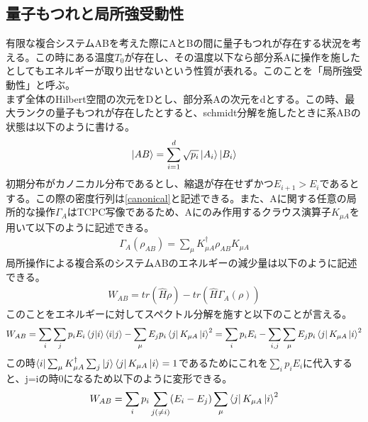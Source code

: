 \documentclass[a4paper,10.5pt]{article}
\numberwithin{equation}{section}
\begin{document}
\subsection{量子もつれと局所強受動性}
 有限な複合システムABを考えた際にAとBの間に量子もつれが存在する状況を考える。この時にある温度$T_{0}$が存在し、その温度以下なら部分系Aに操作を施したとしてもエネルギーが取り出せないという性質が表れる。このことを「局所強受動性」と呼ぶ。\\
 まず全体のHilbert空間の次元をDとし、部分系Aの次元をdとする。この時、最大ランクの量子もつれが存在したとすると、schmidt分解を施したときに系ABの状態は以下のように書ける。
 \begin{equation}\begin{split}
     \ket{AB}=\sum_{i=1}^{d}\sqrt{p_{i}}\ket{A_{i}}\ket{B_{i}} \label{schmidt}
 \end{split} \end{equation}
 初期分布がカノニカル分布であるとし、縮退が存在せずかつ$E_{i+1}>E_{i}$であるとする。この際の密度行列は\eqref{canonical}と記述できる。また、Aに関する任意の局所的な操作$\Gamma_{A}$はTCPC写像であるため、Aにのみ作用するクラウス演算子$K_{\mu A}$を用いて以下のように記述できる。
 \begin{equation}\begin{split}
     \Gamma_{A}(\rho_{AB})=\sum_{\mu}K_{\mu A}^{\dagger}\rho_{AB} K_{\mu A}
 \end{split} \end{equation}
 局所操作による複合系のシステムABのエネルギーの減少量は以下のように記述できる。
 \begin{equation}\begin{split}
     W_{AB} = tr(\hat{H}\rho) -tr(\hat{H}\Gamma_{A}(\rho))
 \end{split} \end{equation}
このことをエネルギーに対してスペクトル分解を施すと以下のことが言える。
\begin{equation}\begin{split}
    W_{AB}=\sum_{i}\sum_{j} p_{i}E_{i}\bra{j}\ket{i}\bra{i}\ket{j}
    -\sum_{\mu}E_{j}p_{i}\bra{j}K_{\mu A}\ket{i}^{2}
    =\sum_{i} p_{i} E_{i} -\sum_{i,j} \sum_{\mu} E_{j}p_{i}\bra{j}K_{\mu A}\ket{i}^{2}
\end{split} \end{equation}
この時$\bra{i}\sum_{\mu} K^{\dagger}_{\mu A}\sum_{j}\ket{j}\bra{j}K_{\mu A}\ket{i}=1$であるためにこれを$\sum_{i}p_{i}E_{i}$に代入すると、j=iの時0になるため以下のように変形できる。
\begin{equation}\begin{split}
    W_{AB}=\sum_{i} p_{i}\sum_{j(\neq i)}(E_{i}-E_{j})\sum_{\mu}\bra{j}K_{\mu A}\ket{i}^{2}
\end{split} \end{equation}
\end{document}
